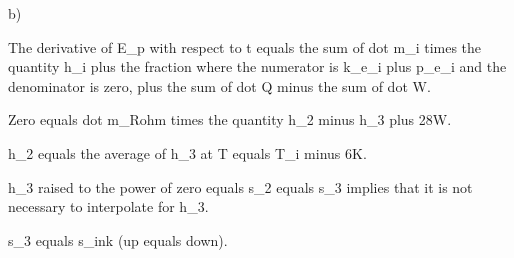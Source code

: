 b)

The derivative of E_p with respect to t equals the sum of dot m_i times the quantity h_i plus the fraction where the numerator is k_e_i plus p_e_i and the denominator is zero, plus the sum of dot Q minus the sum of dot W.

Zero equals dot m_Rohm times the quantity h_2 minus h_3 plus 28W.

h_2 equals the average of h_3 at T equals T_i minus 6K.

h_3 raised to the power of zero equals s_2 equals s_3 implies that it is not necessary to interpolate for h_3.

s_3 equals s_ink (up equals down).